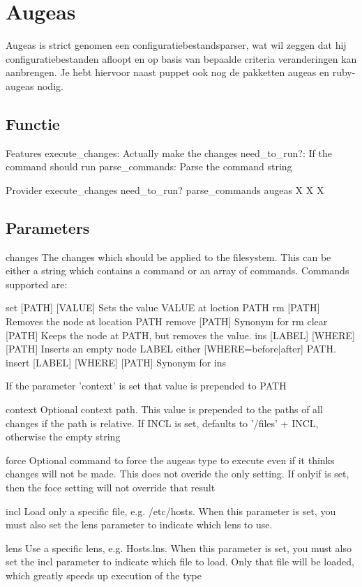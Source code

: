 \section{Augeas}
Augeas is strict genomen een configuratiebestandsparser, wat wil zeggen dat hij configuratiebestanden afloopt en op basis van bepaalde criteria veranderingen kan aanbrengen. Je hebt hiervoor naast puppet ook nog de pakketten augeas en ruby-augeas nodig.

\subsection{Functie}

Features
    execute\_changes: Actually make the changes
    need\_to\_run?: If the command should run
    parse\_commands: Parse the command string

Provider 	execute\_changes 	need\_to\_run? 	parse\_commands
augeas		X 			X 		X

\subsection{Parameters}
changes
The changes which should be applied to the filesystem. This can be either a string which contains a command or an array of commands. Commands supported are:

set [PATH] [VALUE]            Sets the value VALUE at loction PATH
rm [PATH]                     Removes the node at location PATH
remove [PATH]                 Synonym for rm
clear [PATH]                  Keeps the node at PATH, but removes the value.
ins [LABEL] [WHERE] [PATH]    Inserts an empty node LABEL either [WHERE={before|after}] PATH.
insert [LABEL] [WHERE] [PATH] Synonym for ins

If the parameter 'context' is set that value is prepended to PATH

context
Optional context path. This value is prepended to the paths of all changes if the path is relative. If INCL is set, defaults to '/files' + INCL, otherwise the empty string

force
Optional command to force the augeas type to execute even if it thinks changes will not be made. This does not overide the only setting. If onlyif is set, then the foce setting will not override that result

incl
Load only a specific file, e.g. /etc/hosts. When this parameter is set, you must also set the lens parameter to indicate which lens to use.

lens
Use a specific lens, e.g. Hosts.lns. When this parameter is set, you must also set the incl parameter to indicate which file to load. Only that file will be loaded, which greatly speeds up execution of the type

